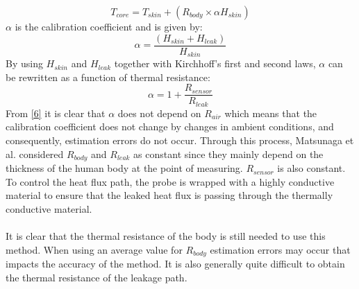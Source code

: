 \begin{equation}
	T_{core} = T_{skin} + (R_{body} \times \alpha H_{skin})
\end{equation}
\noindent
$\alpha$ is the calibration coefficient and is given by:
\begin{equation}
	\alpha = \frac{(H_{skin} + H_{leak})}{H_{skin}}
\end{equation}
\noindent
By using $H_{skin}$ and $H_{leak}$ together with Kirchhoff's first and second laws, $\alpha$ can be rewritten as a function of thermal resistance:
\begin{equation}
	\alpha = 1 + \frac{R_{sensor}}{R_{leak}}
	\label{6}
\end{equation}
\noindent
From \autoref{6} it is clear that $\alpha$ does not depend on $R_{air}$ which means that the calibration coefficient does not change by changes in ambient conditions, and consequently, estimation errors do not occur. Through this process, Matsunaga et al. \cite{Matsunaga2020} considered $R_{body}$ and $R_{leak}$ as constant since they mainly depend on the thickness of the human body at the point of measuring. $R_{sensor}$ is also constant. To control the heat flux path, the probe is wrapped with a highly conductive material to ensure that the leaked heat flux is passing through the thermally conductive material. 
\\
\\
It is clear that the thermal resistance of the body is still needed to use this method. When using an average value for $R_{body}$ estimation errors may occur that impacts the accuracy of the method. It is also generally quite difficult to obtain the thermal resistance of the leakage path. 

